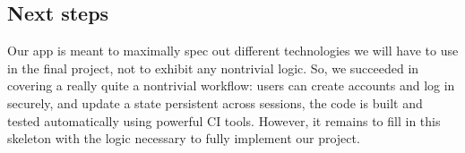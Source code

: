 \documentclass[10pt]{article}
\theoremstyle{remark}
\numberwithin{equation}{section}
\begin{document}

\subsection{Next steps} 
Our app is meant to maximally spec out different technologies we will have to use in the final project, not to exhibit any nontrivial logic. So, we succeeded in covering a really quite a nontrivial workflow: users can create accounts and log in securely, and update a state persistent across sessions, the code is built and tested automatically using powerful CI tools. However, it remains to fill in this skeleton with the logic necessary to fully implement our project. 

\begin{spacing}{0.9}
\printbibliography
\end{spacing}
\end{document}
